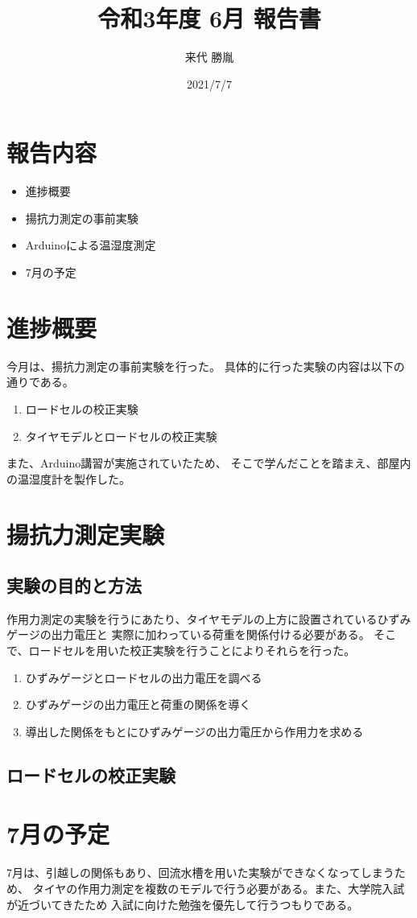 \documentclass[twocolumn,a4j]{jsarticle}
\author{来代 勝胤}
\title{令和3年度 6月 報告書}
\date{2021/7/7}
\begin{document}
\columnseprule=0.1mm
\maketitle
\section*{報告内容}
\begin{itemize}
    \item 進捗概要
    \item 揚抗力測定の事前実験
    \item Arduinoによる温湿度測定
    \item 7月の予定
\end{itemize}
\section{進捗概要}
今月は、揚抗力測定の事前実験を行った。
具体的に行った実験の内容は以下の通りである。
\begin{enumerate}[(1)]
    \item ロードセルの校正実験
    \item タイヤモデルとロードセルの校正実験
\end{enumerate}
また、Arduino講習が実施されていたため、
そこで学んだことを踏まえ、部屋内の温湿度計を製作した。\\
\section{揚抗力測定実験}
\subsection{実験の目的と方法}
作用力測定の実験を行うにあたり、タイヤモデルの上方に設置されているひずみゲージの出力電圧と
実際に加わっている荷重を関係付ける必要がある。
そこで、ロードセルを用いた校正実験を行うことによりそれらを行った。

\begin{enumerate}[Step.1]
    \item ひずみゲージとロードセルの出力電圧を調べる
    \item ひずみゲージの出力電圧と荷重の関係を導く
    \item 導出した関係をもとにひずみゲージの出力電圧から作用力を求める
\end{enumerate}

\subsection{ロードセルの校正実験}


\section{7月の予定}
7月は、引越しの関係もあり、回流水槽を用いた実験ができなくなってしまうため、
タイヤの作用力測定を複数のモデルで行う必要がある。また、大学院入試が近づいてきたため
入試に向けた勉強を優先して行うつもりである。
\end{document}
